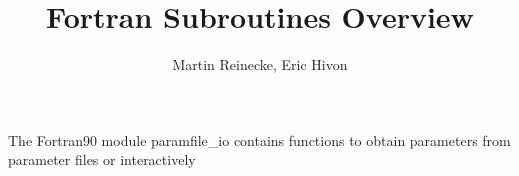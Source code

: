 

\sloppy

\title{\healpix Fortran Subroutines Overview}
 \section[parse\_init, parse\_int, $\ldots$, parse\_finish]{ }
\label{sub:parse_xxx}
\author{Martin Reinecke, Eric Hivon}

\begin{facility}
{The Fortran90 module paramfile\_io contains functions to obtain
parameters from parameter files or interactively}
{\modParamfileIo}
\end{facility}

